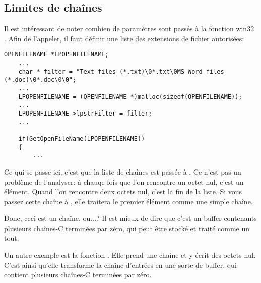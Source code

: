 \subsection{Limites de chaînes}

Il est intéressant de noter combien de paramètres sont passés à la fonction win32
. Afin de l'appeler, il faut définir une liste des extensions
de fichier autorisées:

\begin{lstlisting}[style=customc]
	OPENFILENAME *LPOPENFILENAME;
	...
	char * filter = "Text files (*.txt)\0*.txt\0MS Word files (*.doc)\0*.doc\0\0";
	...
	LPOPENFILENAME = (OPENFILENAME *)malloc(sizeof(OPENFILENAME));
	...
	LPOPENFILENAME->lpstrFilter = filter;
	...

	if(GetOpenFileName(LPOPENFILENAME))
	{
		...
\end{lstlisting}

Ce qui se passe ici, c'est que la liste de chaînes est passée à .
Ce n'est pas un problème de l'analyser: à chauqe fois que l'on rencontre un octet
nul, c'est un élément.
Quand l'on rencontre deux octets nul, c'est la fin de la liste.
Si vous passez cette chaîne à \printf, elle traitera le premier élément comme une
simple chaîne.

Donc, ceci est un chaîne, ou...?
Il est mieux de dire que c'est un buffer contenants plusieurs chaînes-C terminées
par zéro, qui peut être stocké et traité comme un tout.

Un autre exemple est la fonction . Elle prend une chaîne et y écrit
des octets nul.
C'est ainsi qu'elle transforme la chaîne d'entrées en une sorte de buffer, qui contient
plusieurs chaînes-C terminées par zéro.

